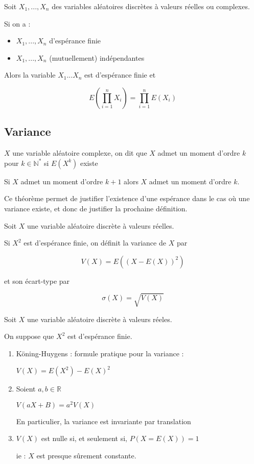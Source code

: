 \documentclass[a4paper,12pt]{book}
\newcommand{\Def}[2]{\begin{tcolorbox}[colback=white,colframe=red!10!green!20!blue!75!, title=Définition : #1]#2\end{tcolorbox}}
\newcommand{\Thr}[2]{\begin{tcolorbox}[sharp corners, colback=white,colframe=red!10!blue!30!green!75!, title=Théorème : #1]#2\end{tcolorbox}}
\def\R{\mathbb{R}}
\def\N{\mathbb{N}}
\begin{document}
\Thr{Espérance d'un produit de n variables indépendantes}{Soit $X_1,...,X_n$ des variables aléatoires discrètes à valeurs réelles ou complexes.
\par Si on a :\begin{itemize}
\item $X_1,..., X_n$ d'espérance finie
\item $X_1,..., X_n$ (mutuellement) indépendantes
\end{itemize}
Alors la variable $X_1...X_n$ est d'espérance finie et
\par $$E\left(\prod\limits_{i=1}^nX_i\right)=\prod\limits_{i=1}^nE(X_i)$$}


\subsection{Variance}
\Def{}{$X$ une variable aléatoire complexe, on dit que $X$ admet un moment d'ordre $k$ pour $k\in\N^*$ si $E(X^k)$ existe}
\Thr{}{Si $X$ admet un moment d'ordre $k+1$ alors $X$ admet un moment d'ordre $k$.}
Ce théorème permet de justifier l'existence d'une espérance dans le cas où une variance existe, et donc de justifier la prochaine définition.
\Def{Variance et ecart-type}{Soit $X$ une variable aléatoire discrète à valeurs réelles.
\par Si $X^2$ est d'espérance finie, on définit la variance de $X$ par
\par $$V(X)=E((X-E(X))^2)$$
\par et son écart-type par
\par $$\sigma(X)=\sqrt{V(X)}$$}
\Thr{Propriétés de la variance}{Soit $X$ une variable aléatoire discrète à valeurs réeles.
\par On suppose que $X^2$ est d'espérance finie.\begin{enumerate}
\item Köning-Huygens : formule pratique pour la variance :\par\begin{center}$V(X)=E(X^2)-E(X)^2$\end{center}
\item Soient $a,b\in\R$ \par\begin{center}$V(aX+B)=a^2V(X)$\end{center} \par En particulier, la variance est invariante par translation
\item $V(X)$ est nulle si, et seulement si, $P(X=E(X))=1$ \par ie : $X$ est presque sûrement constante.
\end{enumerate}}
\end{document}
